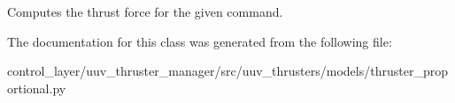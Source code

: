 \begin{DoxyVerb}Computes the thrust force for the given command.\end{DoxyVerb}
 

The documentation for this class was generated from the following file\+:\begin{DoxyCompactItemize}
\item 
control\+\_\+layer/uuv\+\_\+thruster\+\_\+manager/src/uuv\+\_\+thrusters/models/thruster\+\_\+proportional.\+py\end{DoxyCompactItemize}
